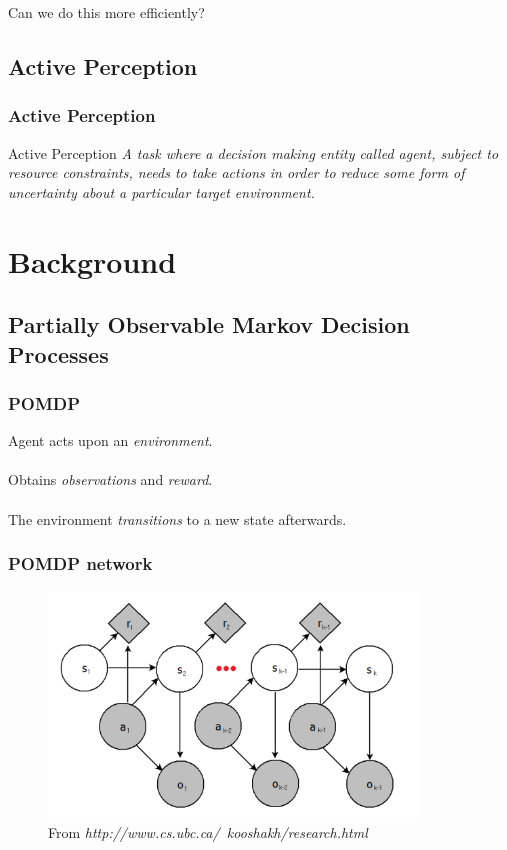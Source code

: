 \documentclass[xcolor={dvipsnames}]{beamer}
\begin{document}
\begin{frame}
Can we do this more efficiently?
\end{frame}

\subsection{Active Perception}
\begin{frame}
\frametitle{Active Perception}
\begin{block}{Active Perception}
\textit{A task where a decision making entity called agent, subject to resource
constraints, needs to take actions in order to reduce some form of uncertainty about a particular
target environment.}
\end{block}
\end{frame}

\section{Background} %

\subsection{Partially Observable Markov Decision Processes}

\begin{frame}
\frametitle{POMDP}
\begin{block}{}
Agent acts upon an \textit{environment}.  \\~\\
Obtains \textit{observations} and \textit{reward}. \\~\\
The environment \textit{transitions} to a new state afterwards.
\end{block}
\end{frame}

\begin{frame}
\frametitle{POMDP network}
\begin{figure}
\centerline{\includegraphics[height=6cm]{images/pomdp.png}}
\caption{From \textit{http://www.cs.ubc.ca/~kooshakh/research.html}}
\end{figure}
\end{frame}
\end{document}
